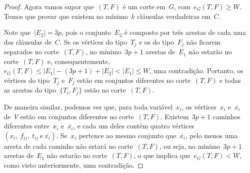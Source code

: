 \begin{proof}



		\bigskip
		\bigskip

		
		Agora vamos supor 
		que~$(T,F)$ é um corte em~$G$,
		com~$e_G(T,F)\ge W$.
		Temos que provar que
		existem no mínimo~$k$ cláusulas verdadeiras em~$C$.

		Note que~${|E_2| = 3}p$, pois o conjunto~$E_2$ é composto por 
		três arestas
		de cada uma das cláusulas de~$C$.  
		Se os vértices do tipo~$T_j$ e os do tipo~$F_j$ não
		ficarem separados no corte~$(T,F)$,
		no mínimo~${3p+1}$ arestas de~$E_1$ não estarão
		no corte~$(T,F)$ e, 
		consequentemente,~${e_G(T,F)\le |E_1|-(3p+1)+|E_2|< |E_1| \le W}$,
		uma contradição. 
		Portanto, os vértices do tipo~$T_j$ e~$F_j$
		estão em conjuntos diferentes no corte~$(T,F)$
		e todas as arestas do tipo~$\{T_i,F_j\}$ estão no
		corte~$(T,F)$.

		De maneira similar, podemos ver que, para toda 
		variável~$x_i$, os vértices~$x_i$ e~$\overline{x_i}$
		de~$V$ estão em conjuntos diferentes no corte~$(T,F)$.
		Existem~$3p+1$ caminhos diferentes entre~$x_i$
		e~$\overline{x_i}$, e cada um deles contém quatro
		vértices~${(x_i,\ f_{ij},\ t_{ij} \ \text{e}\ \overline{x_i})}$.
		Se~$x_i$ pertence ao mesmo conjunto que~$\overline{x_i}$,
		pelo menos uma aresta de cada caminho não estará
		no corte~$(T,F)$, ou seja, no mínimo~$3p+1$ arestas
		de~$E_1$ não estarão no corte~$(T,F)$, o que
		implica que~${e_G(T,F)< W}$, como visto anteriormente,
		uma contradição.


\end{proof}
